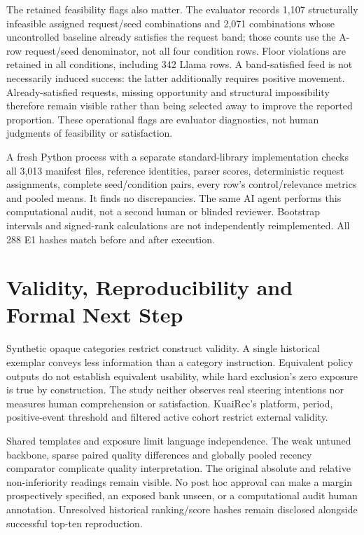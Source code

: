 \documentclass[conference]{IEEEtran}
\begin{document}
The retained feasibility flags also matter. The evaluator records 1,107 structurally infeasible assigned request/seed combinations and 2,071 combinations whose uncontrolled baseline already satisfies the request band; those counts use the A-row request/seed denominator, not all four condition rows. Floor violations are retained in all conditions, including 342 Llama rows. A band-satisfied feed is not necessarily induced success: the latter additionally requires positive movement. Already-satisfied requests, missing opportunity and structural impossibility therefore remain visible rather than being selected away to improve the reported proportion. These operational flags are evaluator diagnostics, not human judgments of feasibility or satisfaction.

A fresh Python process with a separate standard-library implementation checks all 3,013 manifest files, reference identities, parser scores, deterministic request assignments, complete seed/condition pairs, every row's control/relevance metrics and pooled means. It finds no discrepancies. The same AI agent performs this computational audit, not a second human or blinded reviewer. Bootstrap intervals and signed-rank calculations are not independently reimplemented. All 288 E1 hashes match before and after execution.

\section{Validity, Reproducibility and Formal Next Step}
Synthetic opaque categories restrict construct validity. A single historical exemplar conveys less information than a category instruction. Equivalent policy outputs do not establish equivalent usability, while hard exclusion's zero exposure is true by construction. The study neither observes real steering intentions nor measures human comprehension or satisfaction. KuaiRec's platform, period, positive-event threshold and filtered active cohort restrict external validity.

Shared templates and exposure limit language independence. The weak untuned backbone, sparse paired quality differences and globally pooled recency comparator complicate quality interpretation. The original absolute and relative non-inferiority readings remain visible. No post hoc approval can make a margin prospectively specified, an exposed bank unseen, or a computational audit human annotation. Unresolved historical ranking/score hashes remain disclosed alongside successful top-ten reproduction.
\end{document}
